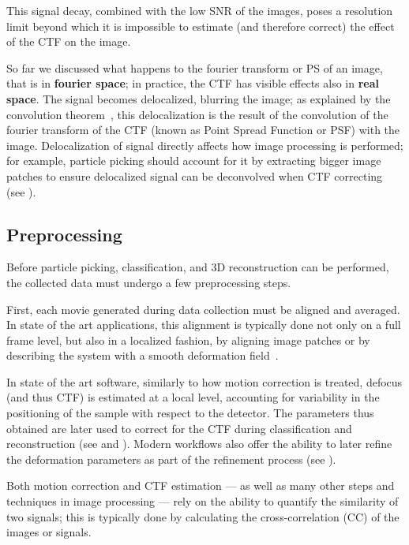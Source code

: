 This signal decay, combined with the low SNR of the images, poses a resolution limit beyond which it is impossible to estimate (and therefore correct) the effect of the CTF on the image.

So far we discussed what happens to the fourier transform or PS of an image, that is in \textbf{fourier space}; in practice, the CTF has visible effects also in \textbf{real space}.
The signal becomes delocalized, blurring the image; as explained by the convolution theorem~\cite{wikipediaConvolutionTheorem2024}, this delocalization is the result of the convolution of the fourier transform of the CTF (known as Point Spread Function or PSF) with the image.
Delocalization of signal directly affects how image processing is performed; for example, particle picking should account for it by extracting bigger image patches to ensure delocalized signal can be deconvolved when CTF correcting (see ).

\subsection{Preprocessing}

Before particle picking, classification, and 3D reconstruction can be performed, the collected data must undergo a few preprocessing steps.

First, each movie generated during data collection must be aligned and averaged.
In state of the art applications, this alignment is typically done not only on a full frame level, but also in a localized fashion, by aligning image patches or by describing the system with a smooth deformation field~\cite{zhengMotionCor2AnisotropicCorrection2017,punjaniCryoSPARCAlgorithmsRapid2017,tegunovRealtimeCryoelectronMicroscopy2019}.

In state of the art software, similarly to how motion correction is treated, defocus (and thus CTF) is estimated at a local level, accounting for variability in the positioning of the sample with respect to the detector.
The parameters thus obtained are later used to correct for the CTF during classification and reconstruction (see  and ).
Modern workflows also offer the ability to later refine the deformation parameters as part of the refinement process (see ).

Both motion correction and CTF estimation --- as well as many other steps and techniques in image processing --- rely on the ability to quantify the similarity of two signals; this is typically done by calculating the cross-correlation (CC) of the images or signals.

